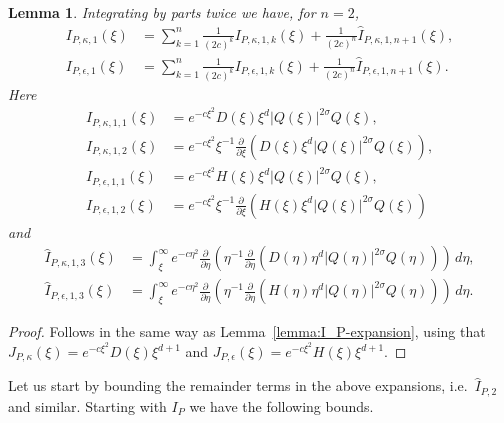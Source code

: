\documentclass[11pt]{article}
\newtheorem{lemma}[definition]{Lemma}
\begin{document}
\begin{lemma}\label{lemma:I_P-derivatives-expansion-2}
  Integrating by parts twice we have, for \(n = 2\),
  \begin{align*}
    I_{P,\kappa,1}(\xi)
    &= \sum_{k = 1}^{n} \frac{1}{(2c)^{k}} I_{P,\kappa,1,k}(\xi)
      + \frac{1}{(2c)^{n}}\hat{I}_{P,\kappa,1,n + 1}(\xi),\\
    I_{P,\epsilon,1}(\xi)
    &= \sum_{k = 1}^{n} \frac{1}{(2c)^{k}} I_{P,\epsilon,1,k}(\xi)
      + \frac{1}{(2c)^{n}}\hat{I}_{P,\epsilon,1,n + 1}(\xi).
  \end{align*}
  Here
  \begin{align*}
    I_{P,\kappa,1,1}(\xi)
    &= e^{-c\xi^{2}}D(\xi)\xi^{d}|Q(\xi)|^{2\sigma}Q(\xi),\\
    I_{P,\kappa,1,2}(\xi)
    &= e^{-c\xi^{2}}\xi^{-1}
      \frac{\partial}{\partial \xi}\left(D(\xi)\xi^{d}|Q(\xi)|^{2\sigma}Q(\xi)\right),\\
    I_{P,\epsilon,1,1}(\xi)
    &= e^{-c\xi^{2}}H(\xi)\xi^{d}|Q(\xi)|^{2\sigma}Q(\xi),\\
    I_{P,\epsilon,1,2}(\xi)
    &= e^{-c\xi^{2}}\xi^{-1}
      \frac{\partial}{\partial \xi}\left(H(\xi)\xi^{d}|Q(\xi)|^{2\sigma}Q(\xi)\right)
  \end{align*}
  and
  \begin{align*}
    \hat{I}_{P,\kappa,1,3}(\xi)
    &= \int_{\xi}^{\infty}
      e^{-c\eta^{2}}\frac{\partial}{\partial \eta}\left(
      \eta^{-1}
      \frac{\partial}{\partial \eta}\left(D(\eta)\eta^{d}|Q(\eta)|^{2\sigma}Q(\eta)\right)
      \right)\,d\eta,\\
    \hat{I}_{P,\epsilon,1,3}(\xi)
    &= \int_{\xi}^{\infty}
      e^{-c\eta^{2}}\frac{\partial}{\partial \eta}\left(
      \eta^{-1}
      \frac{\partial}{\partial \eta}\left(H(\eta)\eta^{d}|Q(\eta)|^{2\sigma}Q(\eta)\right)
      \right)\,d\eta.
  \end{align*}
\end{lemma}

\begin{proof}
  Follows in the same way as Lemma~\ref{lemma:I_P-expansion}, using
  that \(J_{P,\kappa}(\xi) = e^{-c\xi^{2}}D(\xi)\xi^{d + 1}\) and
  \(J_{P,\epsilon}(\xi) = e^{-c\xi^{2}}H(\xi)\xi^{d + 1}\).
\end{proof}

Let us start by bounding the remainder terms in the above expansions,
i.e.\ \(\hat{I}_{P,2}\) and similar. Starting with \(I_{P}\) we have
the following bounds.
\end{document}
